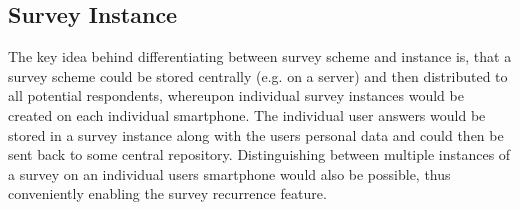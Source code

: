 \subsection{Survey Instance}
\label{subsec:surveyinstance}
The key idea behind differentiating between survey scheme and instance is, that a survey scheme could be stored centrally (e.g. on a server) and then distributed to all potential respondents, whereupon individual survey instances would be created on each individual smartphone. The individual user answers would be stored in a survey instance along with the users personal data and could then be sent back to some central repository. Distinguishing between multiple instances of a survey on an individual users smartphone would also be possible, thus conveniently enabling the survey recurrence feature.